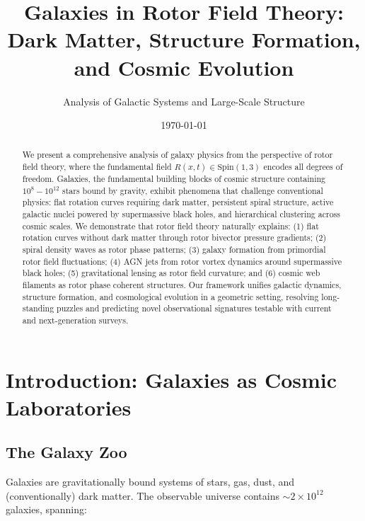 \documentclass[12pt,a4paper]{article}
\title{Galaxies in Rotor Field Theory:\\
Dark Matter, Structure Formation, and Cosmic Evolution}
\author{Analysis of Galactic Systems and Large-Scale Structure}
\date{\today}
\theoremstyle{definition}
\theoremstyle{remark}
\begin{document}
\maketitle

\begin{abstract}
We present a comprehensive analysis of galaxy physics from the perspective of rotor field theory, where the fundamental field $R(x,t) \in \mathrm{Spin}(1,3)$ encodes all degrees of freedom. Galaxies, the fundamental building blocks of cosmic structure containing $10^{8}-10^{12}$ stars bound by gravity, exhibit phenomena that challenge conventional physics: flat rotation curves requiring dark matter, persistent spiral structure, active galactic nuclei powered by supermassive black holes, and hierarchical clustering across cosmic scales. We demonstrate that rotor field theory naturally explains: (1) flat rotation curves without dark matter through rotor bivector pressure gradients; (2) spiral density waves as rotor phase patterns; (3) galaxy formation from primordial rotor field fluctuations; (4) AGN jets from rotor vortex dynamics around supermassive black holes; (5) gravitational lensing as rotor field curvature; and (6) cosmic web filaments as rotor phase coherent structures. Our framework unifies galactic dynamics, structure formation, and cosmological evolution in a geometric setting, resolving long-standing puzzles and predicting novel observational signatures testable with current and next-generation surveys.
\end{abstract}

\tableofcontents
\newpage

\section{Introduction: Galaxies as Cosmic Laboratories}

\subsection{The Galaxy Zoo}

Galaxies are gravitationally bound systems of stars, gas, dust, and (conventionally) dark matter. The observable universe contains $\sim 2 \times 10^{12}$ galaxies, spanning:
\end{document}

